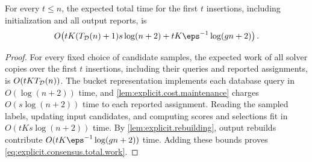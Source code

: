 \begin{lemma}\label{lem:explicit.total.work}
For every $ t\le n $, the expected total time for the first $ t $ insertions, including initialization and all output reports, is
\begin{align}
    O\!\left(
        tK(\edTime{n}+1)s\log(n+2)
        +tK\eps^{-1}\log(gn+2)
    \right).
    \label{eq:explicit.consensus.total.work}
\end{align}
\end{lemma}
\begin{proof}
For every fixed choice of candidate samples, the expected work of all solver copies over the first $ t $ insertions, including their queries and reported assignments, is $ O(tKT_{\mathcal D}(n)) $.
The bucket representation implements each database query in $ O(\log(n+2)) $ time, and \cref{lem:explicit.cost.maintenance} charges $ O(s\log(n+2)) $ time to each reported assignment.
Reading the sampled labels, updating input candidates, and computing scores and selections fit in $ O(tKs\log(n+2)) $ time.
By \cref{lem:explicit.rebuilding}, output rebuilds contribute $ O(tK\eps^{-1}\log(gn+2)) $ time.
Adding these bounds proves \eqref{eq:explicit.consensus.total.work}.
\end{proof}


